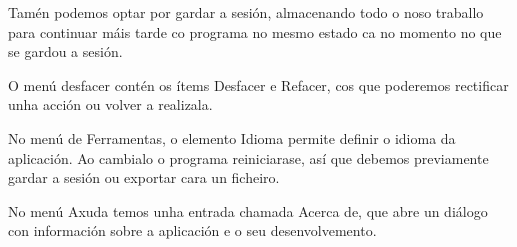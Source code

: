 Tamén podemos optar por gardar a sesión, almacenando todo o noso traballo para continuar máis tarde co programa no mesmo estado ca no momento no que se gardou a sesión.

O menú desfacer contén os ítems Desfacer e Refacer, cos que poderemos rectificar unha acción ou volver a realizala.

No menú de Ferramentas, o elemento Idioma permite definir o idioma da aplicación. Ao cambialo o programa reiniciarase, así que debemos previamente gardar a sesión ou exportar cara un ficheiro.

No menú Axuda temos unha entrada chamada Acerca de, que abre un diálogo con información sobre a aplicación e o seu desenvolvemento.